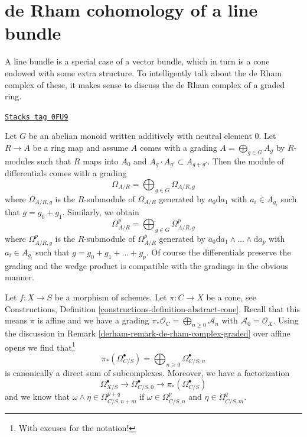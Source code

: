 \section{de Rham cohomology of a line bundle}
\label{derham-section-line-bundle}
A line bundle is a special case of a vector bundle, which in turn is a
cone endowed with some extra structure. To intelligently talk about
the de Rham complex of these, it makes sense to discuss the de Rham
complex of a graded ring.

\begin{remark}

\label{derham-remark-de-rham-complex-graded}
\href{https://stacks.math.columbia.edu/tag/0FU9}{\texttt{Stacks tag 0FU9}}

Let $G$ be an abelian monoid written additively with neutral element $0$.
Let $R \to A$ be a ring map and assume $A$ comes with a grading
$A = \bigoplus_{g \in G} A_g$ by $R$-modules such that $R$ maps into $A_0$
and $A_g \cdot A_{g'} \subset A_{g + g'}$. Then the module of differentials
comes with a grading
$$
\Omega_{A/R} = \bigoplus\nolimits_{g \in G} \Omega_{A/R, g}
$$
where $\Omega_{A/R, g}$ is the $R$-submodule of $\Omega_{A/R}$
generated by $a_0 \text{d}a_1$ with $a_i \in A_{g_i}$ such that
$g = g_0 + g_1$. Similarly, we obtain
$$
\Omega^p_{A/R} = \bigoplus\nolimits_{g \in G} \Omega^p_{A/R, g}
$$
where $\Omega^p_{A/R, g}$ is the $R$-submodule of $\Omega^p_{A/R}$
generated by $a_0 \text{d}a_1 \wedge \ldots \wedge \text{d}a_p$
with $a_i \in A_{g_i}$ such that $g = g_0 + g_1 + \ldots + g_p$.
Of course the differentials preserve the grading and the wedge
product is compatible with the gradings in the obvious manner.
\end{remark}

Let $f : X \to S$ be a morphism of schemes. Let $\pi : C \to X$ be a cone, see
Constructions, Definition \ref{constructions-definition-abstract-cone}.
Recall that this means $\pi$ is affine and we have a grading
$\pi_*\mathcal{O}_C = \bigoplus_{n \geq 0} \mathcal{A}_n$ with
$\mathcal{A}_0 = \mathcal{O}_X$.
Using the discussion in Remark \ref{derham-remark-de-rham-complex-graded}
over affine opens we find that\footnote{With excuses for the notation!}
$$
\pi_*(\Omega^\bullet_{C/S}) =
\bigoplus\nolimits_{n \geq 0} \Omega^\bullet_{C/S, n}
$$
is canonically a direct sum of subcomplexes. Moreover, we have a factorization
$$
\Omega^\bullet_{X/S} \to \Omega^\bullet_{C/S, 0} \to
\pi_*(\Omega^\bullet_{C/S})
$$
and we know that $\omega \wedge \eta \in \Omega^{p + q}_{C/S, n + m}$
if $\omega \in \Omega^p_{C/S, n}$ and $\eta \in \Omega^q_{C/S, m}$.

